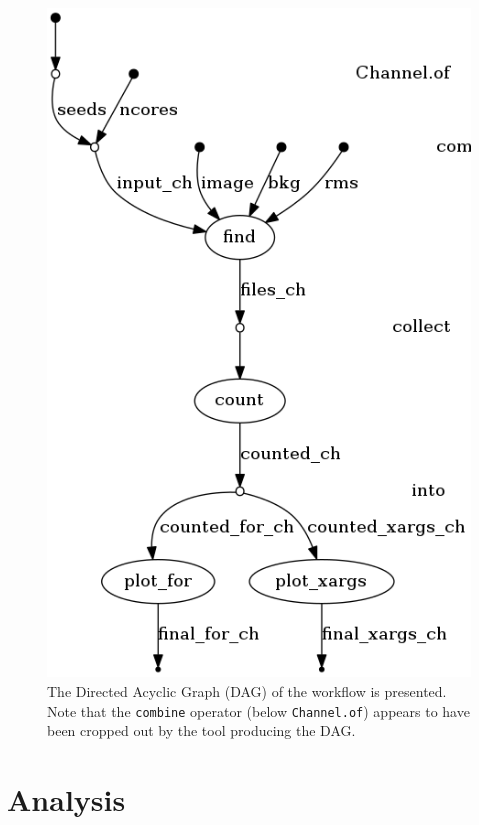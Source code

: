 \documentclass{article}
\begin{document}
\begin{figure}[h]
  \centering
  \includegraphics[scale = 0.4]{../nextflow/logs/final_dag.png}
  \caption[Workflow DAG]{
    The Directed Acyclic Graph (DAG) of the workflow is presented.
    Note that the \lstinline{combine} operator (below \lstinline{Channel.of})
    appears to have been cropped out by the tool producing the DAG.
  }
  \label{fig:workflow-dag}
\end{figure}

\clearpage

\section{Analysis}
\label{sec:analysis}
\end{document}

